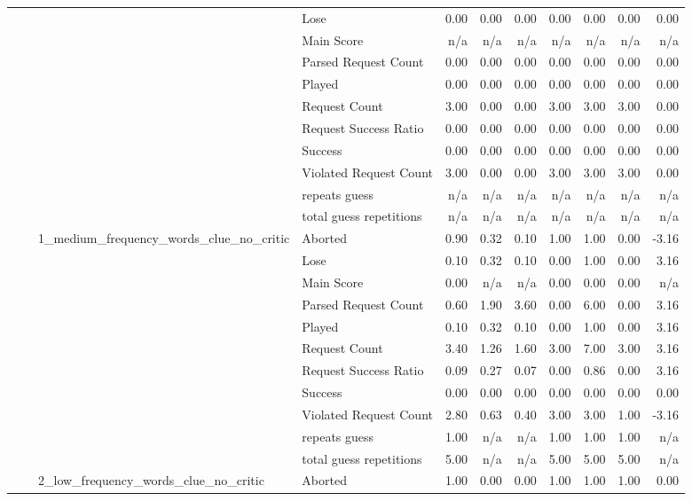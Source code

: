\begin{tabular}{llllrrrrrrr}
 &  &  & Lose & 0.00 & 0.00 & 0.00 & 0.00 & 0.00 & 0.00 & 0.00 \\
 &  &  & Main Score & n/a & n/a & n/a & n/a & n/a & n/a & n/a \\
 &  &  & Parsed Request Count & 0.00 & 0.00 & 0.00 & 0.00 & 0.00 & 0.00 & 0.00 \\
 &  &  & Played & 0.00 & 0.00 & 0.00 & 0.00 & 0.00 & 0.00 & 0.00 \\
 &  &  & Request Count & 3.00 & 0.00 & 0.00 & 3.00 & 3.00 & 3.00 & 0.00 \\
 &  &  & Request Success Ratio & 0.00 & 0.00 & 0.00 & 0.00 & 0.00 & 0.00 & 0.00 \\
 &  &  & Success & 0.00 & 0.00 & 0.00 & 0.00 & 0.00 & 0.00 & 0.00 \\
 &  &  & Violated Request Count & 3.00 & 0.00 & 0.00 & 3.00 & 3.00 & 3.00 & 0.00 \\
 &  &  & repeats guess & n/a & n/a & n/a & n/a & n/a & n/a & n/a \\
 &  &  & total guess repetitions & n/a & n/a & n/a & n/a & n/a & n/a & n/a \\
\cline{3-11}
 &  & \multirow[t]{11}{*}{1_medium_frequency_words_clue_no_critic} & Aborted & 0.90 & 0.32 & 0.10 & 1.00 & 1.00 & 0.00 & -3.16 \\
 &  &  & Lose & 0.10 & 0.32 & 0.10 & 0.00 & 1.00 & 0.00 & 3.16 \\
 &  &  & Main Score & 0.00 & n/a & n/a & 0.00 & 0.00 & 0.00 & n/a \\
 &  &  & Parsed Request Count & 0.60 & 1.90 & 3.60 & 0.00 & 6.00 & 0.00 & 3.16 \\
 &  &  & Played & 0.10 & 0.32 & 0.10 & 0.00 & 1.00 & 0.00 & 3.16 \\
 &  &  & Request Count & 3.40 & 1.26 & 1.60 & 3.00 & 7.00 & 3.00 & 3.16 \\
 &  &  & Request Success Ratio & 0.09 & 0.27 & 0.07 & 0.00 & 0.86 & 0.00 & 3.16 \\
 &  &  & Success & 0.00 & 0.00 & 0.00 & 0.00 & 0.00 & 0.00 & 0.00 \\
 &  &  & Violated Request Count & 2.80 & 0.63 & 0.40 & 3.00 & 3.00 & 1.00 & -3.16 \\
 &  &  & repeats guess & 1.00 & n/a & n/a & 1.00 & 1.00 & 1.00 & n/a \\
 &  &  & total guess repetitions & 5.00 & n/a & n/a & 5.00 & 5.00 & 5.00 & n/a \\
\cline{3-11}
 &  & \multirow[t]{11}{*}{2_low_frequency_words_clue_no_critic} & Aborted & 1.00 & 0.00 & 0.00 & 1.00 & 1.00 & 1.00 & 0.00 \\

\end{tabular}
